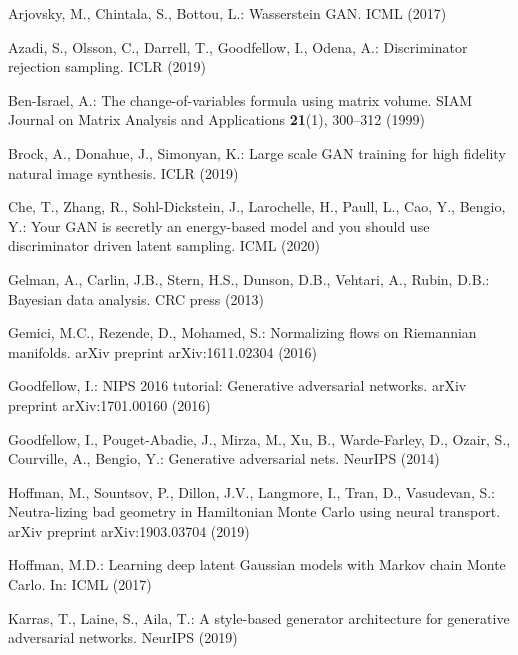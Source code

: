 \documentclass[runningheads]{llncs}
\newcommand{\<}{\left\langle}
\renewcommand{\>}{\right\rangle}
\begin{document}
\begin{thebibliography}{10}
  \providecommand{\url}[1]{\texttt{#1}}
  \providecommand{\urlprefix}{URL }
  \providecommand{\doi}[1]{https://doi.org/#1}
  
  Arjovsky, M., Chintala, S., Bottou, L.: Wasserstein {GAN}. ICML  (2017)


  Azadi, S., Olsson, C., Darrell, T., Goodfellow, I., Odena, A.: Discriminator
    rejection sampling. ICLR  (2019)
  
  Ben-Israel, A.: The change-of-variables formula using matrix volume. SIAM
    Journal on Matrix Analysis and Applications  \textbf{21}(1),  300--312 (1999)
  
  Brock, A., Donahue, J., Simonyan, K.: Large scale {GAN} training for high
    fidelity natural image synthesis. ICLR  (2019)
  
  Che, T., Zhang, R., Sohl-Dickstein, J., Larochelle, H., Paull, L., Cao, Y.,
    Bengio, Y.: Your {GAN} is secretly an energy-based model and you should use
    discriminator driven latent sampling. ICML  (2020)
  
  Gelman, A., Carlin, J.B., Stern, H.S., Dunson, D.B., Vehtari, A., Rubin, D.B.:
    Bayesian data analysis. CRC press (2013)
  
  Gemici, M.C., Rezende, D., Mohamed, S.: Normalizing flows on {Riemannian}
    manifolds. arXiv preprint arXiv:1611.02304  (2016)
  
  Goodfellow, I.: {NIPS} 2016 tutorial: Generative adversarial networks. arXiv
    preprint arXiv:1701.00160  (2016)
  
  Goodfellow, I., Pouget-Abadie, J., Mirza, M., Xu, B., Warde-Farley, D., Ozair,
    S., Courville, A., Bengio, Y.: Generative adversarial nets. NeurIPS  (2014)
  
  Hoffman, M., Sountsov, P., Dillon, J.V., Langmore, I., Tran, D., Vasudevan, S.:
    Neutra-lizing bad geometry in {Hamiltonian Monte Carlo} using neural
    transport. arXiv preprint arXiv:1903.03704  (2019)
  
  Hoffman, M.D.: Learning deep latent {Gaussian} models with {Markov chain Monte
    Carlo}. In: ICML (2017)
  
  Karras, T., Laine, S., Aila, T.: A style-based generator architecture for
    generative adversarial networks. NeurIPS  (2019)
  

\end{thebibliography}
\end{document}
